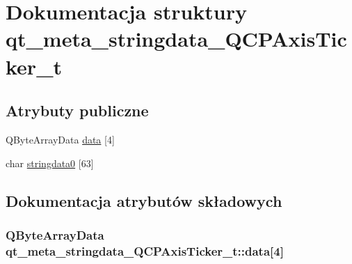 \hypertarget{structqt__meta__stringdata___q_c_p_axis_ticker__t}{}\section{Dokumentacja struktury qt\+\_\+meta\+\_\+stringdata\+\_\+\+Q\+C\+P\+Axis\+Ticker\+\_\+t}
\label{structqt__meta__stringdata___q_c_p_axis_ticker__t}
\subsection*{Atrybuty publiczne}
\begin{DoxyCompactItemize}
\item 
Q\+Byte\+Array\+Data \hyperlink{structqt__meta__stringdata___q_c_p_axis_ticker__t_a0e5e6cc358157945592776d87e7d14b4}{data} \mbox{[}4\mbox{]}
\item 
char \hyperlink{structqt__meta__stringdata___q_c_p_axis_ticker__t_a8600a85cebf0ead1c96536e854070e8b}{stringdata0} \mbox{[}63\mbox{]}
\end{DoxyCompactItemize}


\subsection{Dokumentacja atrybutów składowych}
\subsubsection[{\texorpdfstring{data}{data}}]{\setlength{\rightskip}{0pt plus 5cm}Q\+Byte\+Array\+Data qt\+\_\+meta\+\_\+stringdata\+\_\+\+Q\+C\+P\+Axis\+Ticker\+\_\+t\+::data\mbox{[}4\mbox{]}}\hypertarget{structqt__meta__stringdata___q_c_p_axis_ticker__t_a0e5e6cc358157945592776d87e7d14b4}{}\label{structqt__meta__stringdata___q_c_p_axis_ticker__t_a0e5e6cc358157945592776d87e7d14b4}
